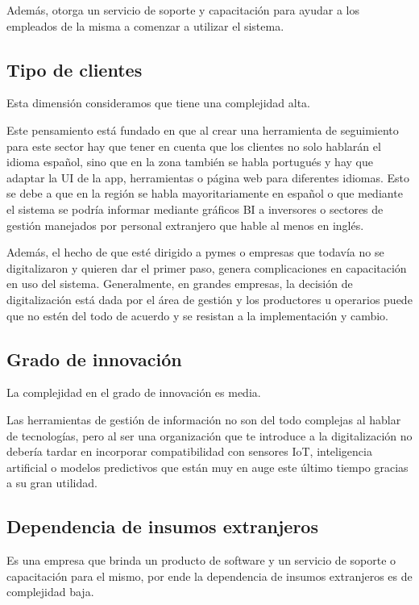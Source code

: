 \documentclass[man,12pt]{apa7}
\begin{document}
Además, otorga un servicio de soporte y capacitación para ayudar a los empleados de la misma a comenzar a utilizar el sistema.

\subsection{Tipo de clientes}

Esta dimensión consideramos que tiene una complejidad alta.

Este pensamiento está fundado en que al crear una herramienta de seguimiento para este sector hay que tener en cuenta que los clientes no solo hablarán el idioma español, sino que en la zona también se habla portugués y hay que adaptar la UI de la app, herramientas o página web para diferentes idiomas. Esto se debe a que en la región se habla mayoritariamente en español o que mediante el sistema se podría informar mediante gráficos BI a inversores o sectores de gestión manejados por personal extranjero que hable al menos en inglés.

Además, el hecho de que esté dirigido a pymes o empresas que todavía no se digitalizaron y quieren dar el primer paso, genera complicaciones en capacitación en uso del sistema. Generalmente, en grandes empresas, la decisión de digitalización está dada por el área de gestión y los productores u operarios puede que no estén del todo de acuerdo y se resistan a la implementación y cambio.

\subsection{Grado de innovación}

La complejidad en el grado de innovación es media.

Las herramientas de gestión de información no son del todo complejas al hablar de tecnologías, pero al ser una organización que te introduce a la digitalización no debería tardar en incorporar compatibilidad con sensores IoT, inteligencia artificial o modelos predictivos que están muy en auge este último tiempo gracias a su gran utilidad.

\subsection{Dependencia de insumos extranjeros}

Es una empresa que brinda un producto de software y un servicio de soporte o capacitación para el mismo, por ende la dependencia de insumos extranjeros es de complejidad baja.
\end{document}
